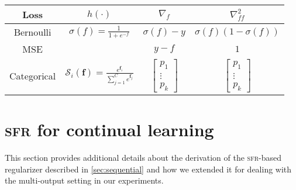 \documentclass{article}
\newcommand{\our}{\textsc{sfr}\xspace}
\newcommand{\mbf}[1]{\mathbf{#1}}
\newcommand{\vf}{\mbf{f}}
\begin{document}
\begin{table}[!ht]
\centering
\caption{}
\begin{tabular}{@{}cccc@{}}
\toprule
Loss        & $h(\cdot)$ & $\nabla_{f}$ & $\nabla^2_{f\!f}$  \\ \midrule
Bernoulli   & $\sigma(f) = \frac{1}{1 + e^{-f}}$ & $\sigma(f) - y$   & $\sigma(f)(1-\sigma(f))$ \\
MSE         & & $y - f$      & $1$ \\
Categorical & $\mathcal{S}_i(\vf) = \frac{e^{\vf_i}}{\sum_{j=1}^C e^{\vf_j}}$ &  $\begin{bmatrix}
		p_1\\ \vdots\\p_k
	\end{bmatrix}$     &   $\begin{bmatrix}
		p_1\\ \vdots\\p_k
	\end{bmatrix}$ \\ \bottomrule
\end{tabular}
\end{table}



\section{\our for continual learning}
\label{app:cl}
This section provides additional details about the derivation of the \our-based regularizer described in \cref{sec:sequential} and how we extended it for dealing with the multi-output setting in our experiments.
\end{document}
